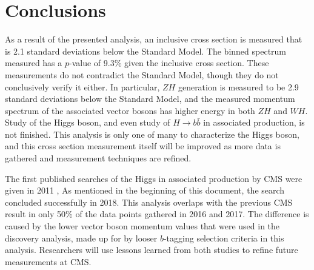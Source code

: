 \chapter{Conclusions} \label{ch:conclusion}

As a result of the presented analysis,
an inclusive cross section is measured that is 2.1 standard deviations below the Standard Model.
The binned spectrum measured has a $p$-value of 9.3\% given the inclusive cross section.
These measurements do not contradict the Standard Model, though they do not conclusively verify it either.
In particular, $Z\!H$ generation is measured to be 2.9 standard deviations below the Standard Model,
and the measured momentum spectrum of the associated vector bosons has higher energy in both $Z\!H$ and $W\!H$.
Study of the Higgs boson, and even study of $H\rightarrow b\bar{b}$ in associated production, is not finished.
This analysis is only one of many to characterize the Higgs boson,
and this cross section measurement itself will be improved as more data is gathered
and measurement techniques are refined.

The first published searches of the Higgs in associated production by CMS
were given in 2011 \cite{CMS-PAS-HIG-11-012},
As mentioned in the beginning of this document, the search concluded successfully in 2018.
This analysis overlaps with the previous CMS result in only 50\% of the data points gathered in 2016 and 2017.
The difference is caused by the lower vector boson momentum values that were used in the discovery analysis,
made up for by looser $b$-tagging selection criteria in this analysis.
Researchers will use lessons learned from both studies to refine future measurements at CMS.

